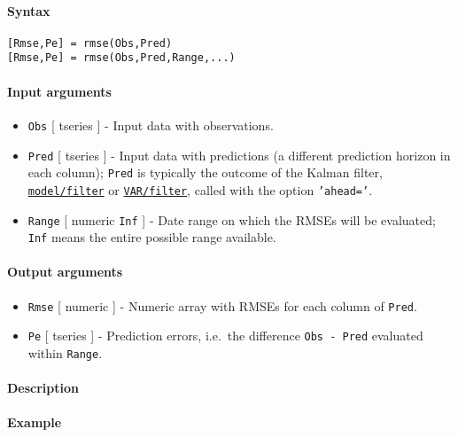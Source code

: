 


	\paragraph{Syntax}\label{syntax}

\begin{verbatim}
[Rmse,Pe] = rmse(Obs,Pred)
[Rmse,Pe] = rmse(Obs,Pred,Range,...)
\end{verbatim}

\paragraph{Input arguments}\label{input-arguments}

\begin{itemize}
\item
  \texttt{Obs} {[} tseries {]} - Input data with observations.
\item
  \texttt{Pred} {[} tseries {]} - Input data with predictions (a
  different prediction horizon in each column); \texttt{Pred} is
  typically the outcome of the Kalman filter,
  \href{model/filter}{\texttt{model/filter}} or
  \href{VAR/filter}{\texttt{VAR/filter}}, called with the option
  \texttt{'ahead='}.
\item
  \texttt{Range} {[} numeric \textbar{} \texttt{Inf} {]} - Date range on
  which the RMSEs will be evaluated; \texttt{Inf} means the entire
  possible range available.
\end{itemize}

\paragraph{Output arguments}\label{output-arguments}

\begin{itemize}
\item
  \texttt{Rmse} {[} numeric {]} - Numeric array with RMSEs for each
  column of \texttt{Pred}.
\item
  \texttt{Pe} {[} tseries {]} - Prediction errors, i.e.~the difference
  \texttt{Obs - Pred} evaluated within \texttt{Range}.
\end{itemize}

\paragraph{Description}\label{description}

\paragraph{Example}\label{example}


